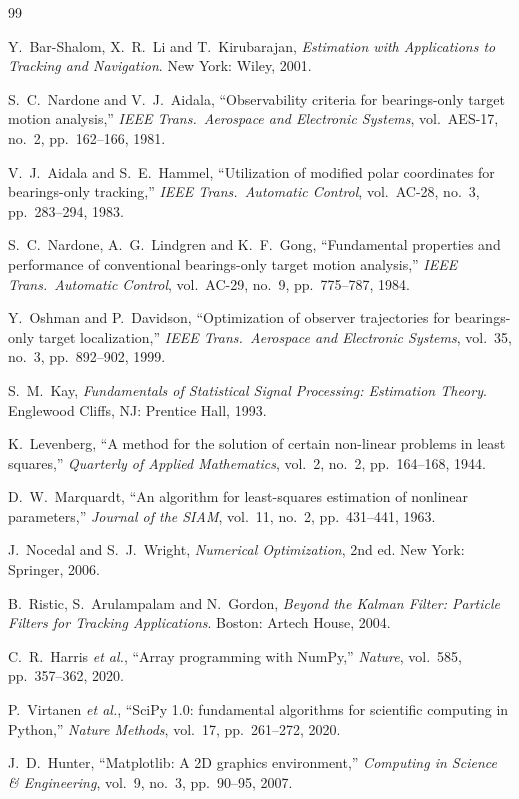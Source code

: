 \documentclass[11pt,a4paper]{article}
\theoremstyle{plain}
\theoremstyle{remark}
\begin{document}
\begin{thebibliography}{99}\small

 Y.~Bar-Shalom, X.~R.~Li and T.~Kirubarajan,
  \emph{Estimation with Applications to Tracking and Navigation}.
  New York: Wiley, 2001.

 S.~C.~Nardone and V.~J.~Aidala,
  ``Observability criteria for bearings-only target motion analysis,''
  \emph{IEEE Trans.\ Aerospace and Electronic Systems}, vol.~AES-17, no.~2,
  pp.~162--166, 1981.

 V.~J.~Aidala and S.~E.~Hammel,
  ``Utilization of modified polar coordinates for bearings-only tracking,''
  \emph{IEEE Trans.\ Automatic Control}, vol.~AC-28, no.~3, pp.~283--294, 1983.

 S.~C.~Nardone, A.~G.~Lindgren and K.~F.~Gong,
  ``Fundamental properties and performance of conventional bearings-only
  target motion analysis,''
  \emph{IEEE Trans.\ Automatic Control}, vol.~AC-29, no.~9, pp.~775--787, 1984.

 Y.~Oshman and P.~Davidson,
  ``Optimization of observer trajectories for bearings-only target
  localization,''
  \emph{IEEE Trans.\ Aerospace and Electronic Systems}, vol.~35, no.~3,
  pp.~892--902, 1999.

 S.~M.~Kay,
  \emph{Fundamentals of Statistical Signal Processing: Estimation Theory}.
  Englewood Cliffs, NJ: Prentice Hall, 1993.

 K.~Levenberg,
  ``A method for the solution of certain non-linear problems in least
  squares,'' \emph{Quarterly of Applied Mathematics}, vol.~2, no.~2,
  pp.~164--168, 1944.

 D.~W.~Marquardt,
  ``An algorithm for least-squares estimation of nonlinear parameters,''
  \emph{Journal of the SIAM}, vol.~11, no.~2, pp.~431--441, 1963.

 J.~Nocedal and S.~J.~Wright,
  \emph{Numerical Optimization}, 2nd ed. New York: Springer, 2006.

 B.~Ristic, S.~Arulampalam and N.~Gordon,
  \emph{Beyond the Kalman Filter: Particle Filters for Tracking Applications}.
  Boston: Artech House, 2004.

 C.~R.~Harris \emph{et al.},
  ``Array programming with NumPy,'' \emph{Nature}, vol.~585, pp.~357--362, 2020.

 P.~Virtanen \emph{et al.},
  ``SciPy 1.0: fundamental algorithms for scientific computing in Python,''
  \emph{Nature Methods}, vol.~17, pp.~261--272, 2020.

 J.~D.~Hunter,
  ``Matplotlib: A 2D graphics environment,''
  \emph{Computing in Science \& Engineering}, vol.~9, no.~3, pp.~90--95, 2007.

\end{thebibliography}
\end{document}
